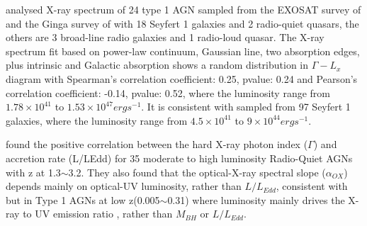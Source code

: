 \citet{1997MNRAS.286..513R} analysed X-ray spectrum of 24 type 1 AGN sampled from the EXOSAT survey of \citet{1989MNRAS.240..833T} and the Ginga survey of \citet{1994MNRAS.268..405N} with 18 Seyfert 1 galaxies and 2 radio-quiet quasars, the others are 3 broad-line radio galaxies and 1 radio-loud quasar. The X-ray spectrum fit based on power-law continuum, Gaussian line, two absorption edges, plus intrinsic and Galactic absorption shows a random distribution in $\Gamma-L_x$ diagram with Spearman's correlation coefficient: 0.25, pvalue: 0.24 and Pearson's correlation coefficient: -0.14, pvalue: 0.52, where the luminosity range from $1.78\times 10^{41}$ to $1.53\times 10^{47} erg s^{-1}$. It is consistent with \citet{2015AASP....5...79S} sampled from 97 Seyfert 1 galaxies, where the luminosity range from $4.5\times 10^{41}$ to $9\times 10^{44} erg s^{-1}$. 


\citet{2008ApJ...682...81S} found the positive correlation between the hard X-ray photon index ($\Gamma$) and accretion rate (L/LEdd) for 35 moderate to high luminosity Radio-Quiet AGNs with z at 1.3$\sim$3.2. They also found that the optical-X-ray spectral slope ($\alpha_{OX}$) depends mainly on optical-UV luminosity, rather than $L/L_{Edd}$, consistent with \citet{2012MNRAS.423..600S} but in Type 1 AGNs at low z(0.005$\sim$0.31) where luminosity mainly drives the X-ray to UV emission ratio , rather than $M_{BH}$ or $L/L_{Edd}$.

